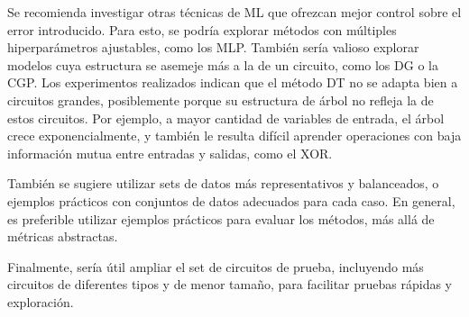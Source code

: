 
Se recomienda investigar otras técnicas de ML que ofrezcan mejor control sobre
el error introducido. Para esto, se podría explorar métodos con múltiples
hiperparámetros ajustables, como los MLP.
También sería valioso explorar modelos cuya estructura se asemeje más a la de
un circuito, como los DG o la CGP.
Los experimentos realizados indican que el método DT no se adapta bien a
circuitos grandes, posiblemente porque su estructura de árbol no refleja la de
estos circuitos.
Por ejemplo, a mayor cantidad de variables de entrada, el árbol crece
exponencialmente, y también le resulta difícil aprender operaciones con baja
información mutua entre entradas y salidas, como el XOR.

También se sugiere utilizar sets de datos más representativos y balanceados, o
ejemplos prácticos con conjuntos de datos adecuados para cada caso.
En general, es preferible utilizar ejemplos prácticos para evaluar los métodos,
más allá de métricas abstractas.

Finalmente, sería útil ampliar el set de circuitos de prueba, incluyendo más
circuitos de diferentes tipos y de menor tamaño, para facilitar pruebas rápidas
y exploración.
